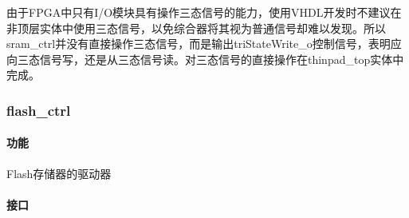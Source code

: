 \documentclass{article}
\begin{document}
\begin{spacing}{1.4}
由于FPGA中只有I/O模块具有操作三态信号的能力，使用VHDL开发时不建议在非顶层实体中使用三态信号，以免综合器将其视为普通信号却难以发现。所以sram\_ctrl并没有直接操作三态信号，而是输出triStateWrite\_o控制信号，表明应向三态信号写，还是从三态信号读。对三态信号的直接操作在thinpad\_top实体中完成。

\subsubsection{flash\_ctrl}

\paragraph{功能}\mbox{}

Flash存储器的驱动器

\paragraph{接口}\mbox{}


\end{spacing}
\end{document}
